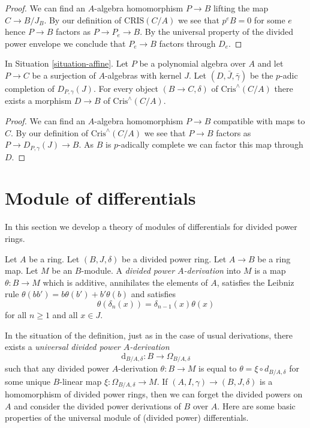 \begin{proof}
We can find an $A$-algebra homomorphism $P \to B$
lifting the map $C \to B/J_B$. By our definition of
$\text{CRIS}(C/A)$ we see that $p^eB = 0$ for
some $e$ hence $P \to B$ factors as $P \to P_e \to B$.
By the universal property of the divided power envelope we
conclude that $P_e \to B$ factors through $D_e$.
\end{proof}

\begin{lemma}
\label{lemma-generator-completion}
In Situation \ref{situation-affine}.
Let $P$ be a polynomial algebra over $A$ and let
$P \to C$ be a surjection of $A$-algebras with kernel $J$.
Let $(D, \bar J, \bar\gamma)$ be the $p$-adic completion of
$D_{P, \gamma}(J)$. For every object $(B \to C, \delta)$ of
$\text{Cris}^\wedge(C/A)$ there
exists a morphism $D \to B$ of $\text{Cris}^\wedge(C/A)$.
\end{lemma}

\begin{proof}
We can find an $A$-algebra homomorphism $P \to B$ compatible
with maps to $C$. By our definition of
$\text{Cris}^\wedge(C/A)$ we see that $P \to B$ factors as
$P \to D_{P, \gamma}(J) \to B$. As $B$ is $p$-adically complete
we can factor this map through $D$.
\end{proof}



\section{Module of differentials}
\label{section-differentials}

\noindent
In this section we develop a theory of modules of differentials
for divided power rings.

\begin{definition}
\label{definition-derivation}
Let $A$ be a ring. Let $(B, J, \delta)$ be a divided power ring.
Let $A \to B$ be a ring map. Let $M$ be an $B$-module.
A {\it divided power $A$-derivation} into $M$ is a map
$\theta : B \to M$ which is additive, annihilates the elements
of $A$, satisfies the Leibniz rule
$\theta(bb') = b\theta(b') + b'\theta(b)$ and satisfies
$$
\theta(\delta_n(x)) = \delta_{n - 1}(x)\theta(x)
$$
for all $n \geq 1$ and all $x \in J$.
\end{definition}

\noindent
In the situation of the definition, just as in the case of usual
derivations, there exists a {\it universal divided power $A$-derivation}
$$
\text{d}_{B/A, \delta} : B \to \Omega_{B/A, \delta}
$$
such that any divided power $A$-derivation $\theta : B \to M$ is equal to
$\theta = \xi \circ d_{B/A, \delta}$ for some unique $B$-linear map
$\xi : \Omega_{B/A, \delta} \to M$. If $(A, I, \gamma) \to (B, J, \delta)$
is a homomorphism of divided power rings, then we can forget the
divided powers on $A$ and consider the divided power derivations of
$B$ over $A$. Here are some basic properties of the universal
module of (divided power) differentials.

